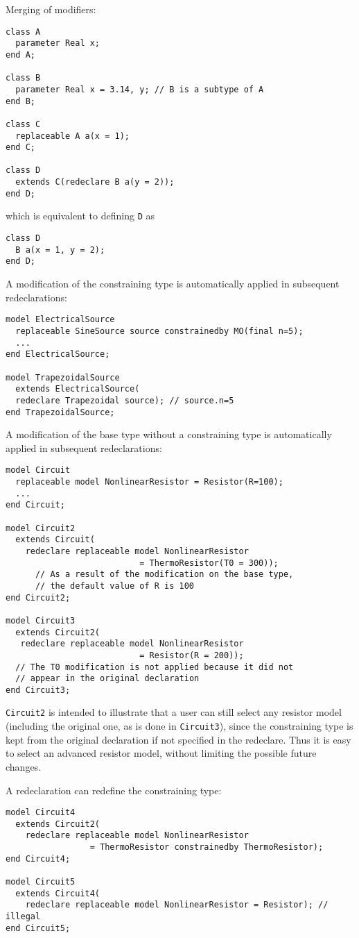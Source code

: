 \begin{example}
Merging of modifiers:
\begin{lstlisting}[language=modelica]
class A
  parameter Real x;
end A;

class B
  parameter Real x = 3.14, y; // B is a subtype of A
end B;

class C
  replaceable A a(x = 1);
end C;

class D
  extends C(redeclare B a(y = 2));
end D;
\end{lstlisting}
which is equivalent to defining \lstinline!D! as
\begin{lstlisting}[language=modelica]
class D
  B a(x = 1, y = 2);
end D;
\end{lstlisting}

A modification of the constraining type is automatically applied
in subsequent redeclarations:
\begin{lstlisting}[language=modelica]
model ElectricalSource
  replaceable SineSource source constrainedby MO(final n=5);
  ...
end ElectricalSource;

model TrapezoidalSource
  extends ElectricalSource(
  redeclare Trapezoidal source); // source.n=5
end TrapezoidalSource;
\end{lstlisting}

A modification of the base type without a constraining type is
automatically applied in subsequent redeclarations:
\begin{lstlisting}[language=modelica]
model Circuit
  replaceable model NonlinearResistor = Resistor(R=100);
  ...
end Circuit;

model Circuit2
  extends Circuit(
    redeclare replaceable model NonlinearResistor
                           = ThermoResistor(T0 = 300));
      // As a result of the modification on the base type,
      // the default value of R is 100
end Circuit2;

model Circuit3
  extends Circuit2(
   redeclare replaceable model NonlinearResistor
                           = Resistor(R = 200));
  // The T0 modification is not applied because it did not
  // appear in the original declaration
end Circuit3;
\end{lstlisting}

\lstinline!Circuit2! is intended to illustrate that a user can still select
any resistor model (including the original one, as is done in \lstinline!Circuit3!),
since the constraining type is kept from the original declaration if not
specified in the redeclare. Thus it is easy to select an advanced
resistor model, without limiting the possible future changes.

A redeclaration can redefine the constraining type:
\begin{lstlisting}[language=modelica]
model Circuit4
  extends Circuit2(
    redeclare replaceable model NonlinearResistor
                 = ThermoResistor constrainedby ThermoResistor);
end Circuit4;

model Circuit5
  extends Circuit4(
    redeclare replaceable model NonlinearResistor = Resistor); // illegal
end Circuit5;
\end{lstlisting}
\end{example}

